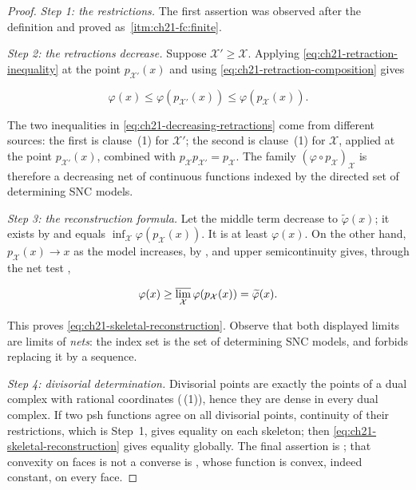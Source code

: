 \begin{proof}
\emph{Step 1: the restrictions.}
The first assertion was observed after the definition and proved as
\,\cref{itm:ch21-fc:finite}.

\emph{Step 2: the retractions decrease.}
Suppose
\(\mathcal X'\geq\mathcal X\).  Applying
\eqref{eq:ch21-retraction-inequality} at the point
\(p_{\mathcal X'}(x)\) and using
\eqref{eq:ch21-retraction-composition} gives

\begin{equation}
\label{eq:ch21-decreasing-retractions}
 \varphi(x)
 \leq\varphi(p_{\mathcal X'}(x))
 \leq\varphi(p_{\mathcal X}(x)).
\end{equation}

The two inequalities in \eqref{eq:ch21-decreasing-retractions} come from
different sources: the first is clause~(1) for \(\mathcal X'\); the second is
clause~(1) for \(\mathcal X\), applied at the point
\(p_{\mathcal X'}(x)\), combined with
\(p_{\mathcal X}p_{\mathcal X'}=p_{\mathcal X}\).  The family
\((\varphi\circ p_{\mathcal X})_{\mathcal X}\) is therefore a decreasing net
of continuous functions indexed by the directed set of determining SNC
models.

\emph{Step 3: the reconstruction formula.}
Let the middle term decrease to \(\widetilde\varphi(x)\); it exists by
 and equals
\(\inf_{\mathcal X}\varphi(p_{\mathcal X}(x))\).  It is at least
\(\varphi(x)\).  On the other hand, \(p_{\mathcal X}(x)\to x\) as
the model increases, by , and upper
semicontinuity gives, through the net test
,

\[
 \varphi(x)\geq
 \varlimsup_{\mathcal X}\varphi(p_{\mathcal X}(x))
 =\widetilde\varphi(x).
\]

This proves \eqref{eq:ch21-skeletal-reconstruction}.  Observe that both
displayed limits are limits of \emph{nets}: the index set is the set of
determining SNC models, and  forbids
replacing it by a sequence.

\emph{Step 4: divisorial determination.}
Divisorial points are exactly the points of a dual complex with rational
coordinates (\,(1)), hence they are
dense in every dual complex.
If two psh functions agree on all divisorial points, continuity of their
restrictions, which is Step~1, gives
equality on each skeleton; then
\eqref{eq:ch21-skeletal-reconstruction} gives equality globally.  The final
assertion is ; that convexity on faces
is not a converse is , whose function is
convex, indeed constant, on every face.
\end{proof}

